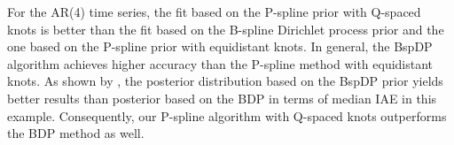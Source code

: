 \documentclass[twocolumn,final]{svjour3}
\begin{document}

For the AR(4) time series, the fit based on the P-spline prior with Q-spaced knots is better than the fit based on the B-spline Dirichlet process prior and the one based on the P-spline prior with equidistant knots.
 In general, the BspDP algorithm achieves higher accuracy than the P-spline method with equidistant knots.  As shown by \cite{Edwards2019}, the posterior distribution based on the BspDP prior yields better results than posterior based on the BDP in terms of median IAE in this example.  Consequently, our P-spline algorithm with Q-spaced knots outperforms the BDP method as well.


\end{document}
